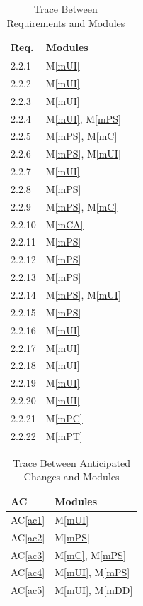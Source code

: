 \documentclass[12pt, titlepage]{article}
\newcommand{\acref}[1]{AC\ref{#1}}
\newcommand{\mref}[1]{M\ref{#1}}
\begin{document}
\begin{table}[H]
\centering
\begin{tabular}{p{} p{}}
\toprule
\textbf{Req.} & \textbf{Modules}\\
\midrule
2.2.1 & \mref{mUI}\\
2.2.2 & \mref{mUI} \\
2.2.3 & \mref{mUI}\\
2.2.4 & \mref{mUI}, \mref{mPS}\\
2.2.5 & \mref{mPS}, \mref{mC} \\
2.2.6 & \mref{mPS}, \mref{mUI}\\
2.2.7 & \mref{mUI}\\
2.2.8 & \mref{mPS} \\
2.2.9 & \mref{mPS}, \mref{mC} \\
2.2.10 & \mref{mCA} \\
2.2.11 & \mref{mPS} \\
2.2.12 & \mref{mPS} \\
2.2.13 & \mref{mPS} \\
2.2.14 & \mref{mPS}, \mref{mUI} \\
2.2.15 & \mref{mPS} \\
2.2.16 & \mref{mUI} \\
2.2.17 & \mref{mUI} \\
2.2.18 & \mref{mUI} \\
2.2.19 & \mref{mUI} \\
2.2.20 & \mref{mUI} \\
2.2.21 & \mref{mPC} \\
2.2.22 & \mref{mPT} \\
\bottomrule
\end{tabular}
\caption{Trace Between Requirements and Modules}
\label{TblRT}
\end{table}

\begin{table}[H]
\centering
\begin{tabular}{p{} p{}}
\toprule
\textbf{AC} & \textbf{Modules}\\
\midrule
\acref{ac1} & \mref{mUI}\\
\acref{ac2} & \mref{mPS}\\
\acref{ac3} & \mref{mC}, \mref{mPS}\\
\acref{ac4} & \mref{mUI}, \mref{mPS}\\
\acref{ac5} & \mref{mUI}, \mref{mDD}\\
\bottomrule
\end{tabular}
\caption{Trace Between Anticipated Changes and Modules}
\label{TblACT}
\end{table}
\end{document}
